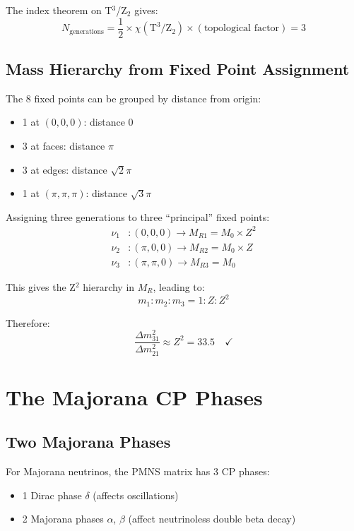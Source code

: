 \documentclass[12pt,a4paper]{article}
\begin{document}
The index theorem on T$^3$/Z$_2$ gives:
\begin{equation}
N_{\text{generations}} = \frac{1}{2} \times \chi(\text{T}^3/\text{Z}_2) \times (\text{topological factor}) = 3
\end{equation}

\subsection{Mass Hierarchy from Fixed Point Assignment}

The 8 fixed points can be grouped by distance from origin:
\begin{itemize}
\item 1 at $(0,0,0)$: distance 0
\item 3 at faces: distance $\pi$
\item 3 at edges: distance $\sqrt{2}\pi$
\item 1 at $(\pi,\pi,\pi)$: distance $\sqrt{3}\pi$
\end{itemize}

Assigning three generations to three ``principal'' fixed points:
\begin{align}
\nu_1&: (0,0,0) \rightarrow M_{R1} = M_0 \times Z^2 \\
\nu_2&: (\pi,0,0) \rightarrow M_{R2} = M_0 \times Z \\
\nu_3&: (\pi,\pi,0) \rightarrow M_{R3} = M_0
\end{align}

This gives the Z$^2$ hierarchy in $M_R$, leading to:
\begin{equation}
m_1 : m_2 : m_3 = 1 : Z : Z^2
\end{equation}

Therefore:
\begin{equation}
\frac{\Delta m^2_{31}}{\Delta m^2_{21}} \approx Z^2 = 33.5 \quad \checkmark
\end{equation}

\section{The Majorana CP Phases}

\subsection{Two Majorana Phases}

For Majorana neutrinos, the PMNS matrix has 3 CP phases:
\begin{itemize}
\item 1 Dirac phase $\delta$ (affects oscillations)
\item 2 Majorana phases $\alpha$, $\beta$ (affect neutrinoless double beta decay)
\end{itemize}
\end{document}
